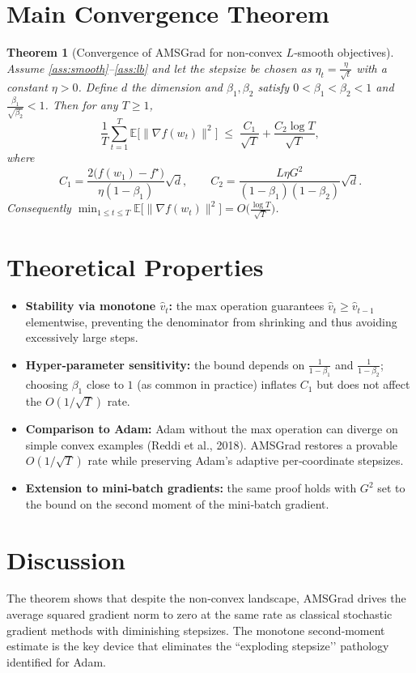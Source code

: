 \documentclass{article}
\newtheorem{theorem}{Theorem}
\begin{document}
\section*{Main Convergence Theorem}
\begin{theorem}[Convergence of AMSGrad for non‑convex $L$‑smooth objectives]\label{thm:main}
Assume \ref{ass:smooth}–\ref{ass:lb} and let the stepsize be chosen as $\eta_t=\frac{\eta}{\sqrt{t}}$ with a constant $\eta>0$.  
Define $d$ the dimension and $\beta_1,\beta_2$ satisfy $0<\beta_1<\beta_2<1$ and $\frac{\beta_1}{\sqrt{\beta_2}}<1$.  
Then for any $T\ge 1$,
\[
\frac{1}{T}\sum_{t=1}^{T}\mathbb{E}\big[\|\nabla f(w_t)\|^2\big]
\;\le\;
\frac{C_1}{\sqrt{T}}+\frac{C_2\log T}{\sqrt{T}},
\]
where
\[
C_1=\frac{2\big(f(w_1)-f^\star\big)}{\eta(1-\beta_1)}\sqrt{d},\qquad
C_2=\frac{L\eta G^2}{(1-\beta_1)(1-\beta_2)}\sqrt{d}.
\]
Consequently $\displaystyle\min_{1\le t\le T}\mathbb{E}\big[\|\nabla f(w_t)\|^2\big]=O\!\big(\tfrac{\log T}{\sqrt{T}}\big)$.
\end{theorem}

\section*{Theoretical Properties}
\begin{itemize}
\item \textbf{Stability via monotone $\hat v_t$:} the max operation guarantees $\hat v_t\ge\hat v_{t-1}$ elementwise, preventing the denominator from shrinking and thus avoiding excessively large steps.
\item \textbf{Hyper‑parameter sensitivity:} the bound depends on $\frac{1}{1-\beta_1}$ and $\frac{1}{1-\beta_2}$; choosing $\beta_1$ close to $1$ (as common in practice) inflates $C_1$ but does not affect the $O(1/\sqrt{T})$ rate.
\item \textbf{Comparison to Adam:} Adam without the max operation can diverge on simple convex examples (Reddi et al., 2018). AMSGrad restores a provable $O(1/\sqrt{T})$ rate while preserving Adam’s adaptive per‑coordinate stepsizes.
\item \textbf{Extension to mini‑batch gradients:} the same proof holds with $G^2$ set to the bound on the second moment of the mini‑batch gradient.
\end{itemize}

\section*{Discussion}
The theorem shows that despite the non‑convex landscape, AMSGrad drives the average squared gradient norm to zero at the same rate as classical stochastic gradient methods with diminishing stepsizes. The monotone second‑moment estimate is the key device that eliminates the “exploding stepsize’’ pathology identified for Adam.
\end{document}
